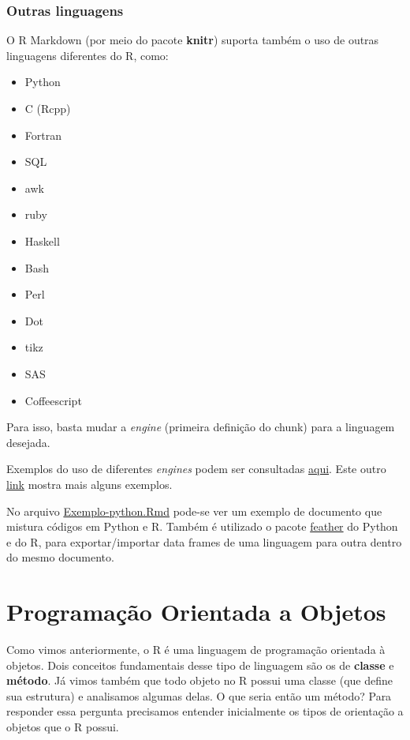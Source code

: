 \documentclass[10pt,a4paper]{book}
\providecommand{\tightlist}{%
  \setlength{\itemsep}{0pt}\setlength{\parskip}{0pt}}
\begin{document}
\subsection{Outras linguagens}\label{outras-linguagens}

O R Markdown (por meio do pacote \textbf{knitr}) suporta também o uso de
outras linguagens diferentes do R, como:

\begin{itemize}
\tightlist
\item
  Python
\item
  C (Rcpp)
\item
  Fortran
\item
  SQL
\item
  awk
\item
  ruby
\item
  Haskell
\item
  Bash
\item
  Perl
\item
  Dot
\item
  tikz
\item
  SAS
\item
  Coffeescript
\end{itemize}

Para isso, basta mudar a \emph{engine} (primeira definição do chunk)
para a linguagem desejada.

Exemplos do uso de diferentes \emph{engines} podem ser consultadas
\href{https://yihui.name/knitr/demo/engines/}{aqui}. Este outro
\href{https://rmarkdown.rstudio.com/authoring_knitr_engines.html}{link}
mostra mais alguns exemplos.

No arquivo \href{exemplos/Exemplo-python.Rmd}{Exemplo-python.Rmd}
pode-se ver um exemplo de documento que mistura códigos em Python e R.
Também é utilizado o pacote
\href{https://blog.rstudio.com/2016/03/29/feather/}{feather} do Python e
do R, para exportar/importar data frames de uma linguagem para outra
dentro do mesmo documento.

\chapter{Programação Orientada a
Objetos}\label{programacao-orientada-a-objetos}

Como vimos anteriormente, o R é uma linguagem de programação orientada à
objetos. Dois conceitos fundamentais desse tipo de linguagem são os de
\textbf{classe} e \textbf{método}. Já vimos também que todo objeto no R
possui uma classe (que define sua estrutura) e analisamos algumas delas.
O que seria então um método? Para responder essa pergunta precisamos
entender inicialmente os tipos de orientação a objetos que o R possui.
\end{document}
